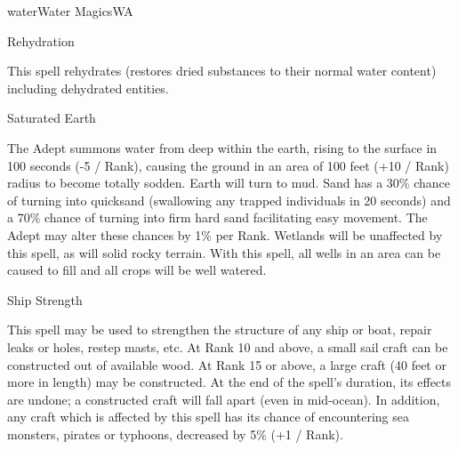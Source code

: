 \begin{College}[1.3]{water}{Water Magics}{WA}
\begin{spell}[G-6]{Rehydration}
\begin{effects}
This spell rehydrates (restores dried substances to their normal
water content) including dehydrated entities.
\end{effects}
\end{spell}

\begin{spell}[G-7]{Saturated Earth}

\begin{effects}
The Adept summons water from deep within the earth, rising to the
surface in 100 seconds (-5 / Rank), causing the ground in an area of
100 feet (+10 / Rank) radius to become totally sodden.  Earth will
turn to mud.  Sand has a 30\% chance of turning into quicksand
(swallowing any trapped individuals in 20 seconds) and a 70\% chance
of turning into firm hard sand facilitating easy movement.  The Adept
may alter these chances by 1\% per Rank.  Wetlands will be unaffected
by this spell, as will solid rocky terrain.  With this spell, all
wells in an area can be caused to fill and all crops will be well
watered.
\end{effects}
\end{spell}

\begin{spell}[G-8]{Ship Strength}

\begin{effects}
This spell may be used to strengthen the structure of any ship or
boat, repair leaks or holes, restep masts, etc.  At Rank 10 and above,
a small sail craft can be constructed out of available wood.  At Rank
15 or above, a large craft (40 feet or more in length) may be
constructed.  At the end of the spell’s duration, its effects are
undone; a constructed craft will fall apart (even in mid-ocean). In
addition, any craft which is affected by this spell has its chance of
encountering sea monsters, pirates or typhoons, decreased by 5\% (+1 /
Rank).
\end{effects}
\end{spell}


\end{College}
